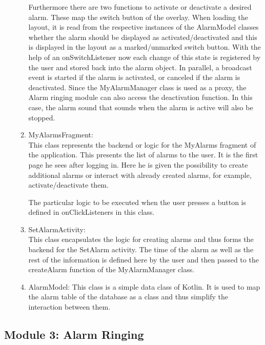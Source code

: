 \documentclass[conference]{IEEEtran}
\begin{document}
\begin{enumerate}
\begin{enumerate}
            \par Furthermore there are two functions to activate or deactivate a desired alarm. These map the switch button of the overlay. When loading the layout, it is read from the respective instances of the AlarmModel classes whether the alarm should be displayed as activated/deactivated and this is displayed in the layout as a marked/unmarked switch button. With the help of an onSwitchListener now each change of this state is registered by the user and stored back into the alarm object. In parallel, a broadcast event is started if the alarm is activated, or canceled if the alarm is deactivated. Since the MyAlarmManager class is used as a proxy, the Alarm ringing module can also access the deactivation function. In this case, the alarm sound that sounds when the alarm is active will also be stopped.\\
        \item MyAlarmsFragment: \\
            This class represents the backend or logic for the MyAlarms fragment of the application. This presents the list of alarms to the user. It is the first page he sees after logging in. Here he is given the possibility to create additional alarms or interact with already created alarms, for example, activate/deactivate them.
            \par The particular logic to be executed when the user presses a button is defined in onClickListeners in this class. \\
        \item SetAlarmActivity: \\
            This class encapsulates the logic for creating alarms and thus forms the backend for the SetAlarm activity. The time of the alarm as well as the rest of the information is defined here by the user and then passed to the createAlarm function of the MyAlarmManager class. \\
        \item AlarmModel:
            This class is a simple data class of Kotlin. It is used to map the alarm table of the database as a class and thus simplify the interaction between them. \\
        
    \end{enumerate}
\end{enumerate}

\subsection{Module 3: Alarm Ringing}
\end{document}
